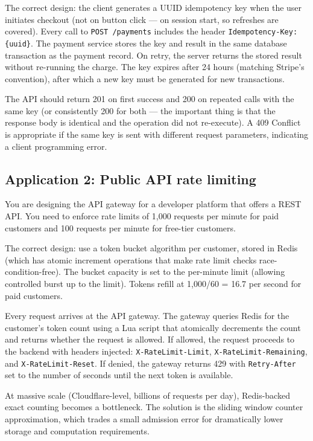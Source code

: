 \documentclass[11pt,a4paper]{article}
\begin{document}
The correct design: the client generates a UUID idempotency key when the user initiates checkout (not on button click --- on session start, so refreshes are covered). Every call to \texttt{POST /payments} includes the header \texttt{Idempotency-Key: \{uuid\}}. The payment service stores the key and result in the same database transaction as the payment record. On retry, the server returns the stored result without re-running the charge. The key expires after 24 hours (matching Stripe's convention), after which a new key must be generated for new transactions.

The API should return 201 on first success and 200 on repeated calls with the same key (or consistently 200 for both --- the important thing is that the response body is identical and the operation did not re-execute). A 409 Conflict is appropriate if the same key is sent with different request parameters, indicating a client programming error.

\subsection{Application 2: Public API rate limiting}

You are designing the API gateway for a developer platform that offers a REST API. You need to enforce rate limits of 1,000 requests per minute for paid customers and 100 requests per minute for free-tier customers.

The correct design: use a token bucket algorithm per customer, stored in Redis (which has atomic increment operations that make rate limit checks race-condition-free). The bucket capacity is set to the per-minute limit (allowing controlled burst up to the limit). Tokens refill at 1,000/60 = 16.7 per second for paid customers.

Every request arrives at the API gateway. The gateway queries Redis for the customer's token count using a Lua script that atomically decrements the count and returns whether the request is allowed. If allowed, the request proceeds to the backend with headers injected: \texttt{X-RateLimit-Limit}, \texttt{X-RateLimit-Remaining}, and \texttt{X-RateLimit-Reset}. If denied, the gateway returns 429 with \texttt{Retry-After} set to the number of seconds until the next token is available.

At massive scale (Cloudflare-level, billions of requests per day), Redis-backed exact counting becomes a bottleneck. The solution is the sliding window counter approximation, which trades a small admission error for dramatically lower storage and computation requirements.
\end{document}

